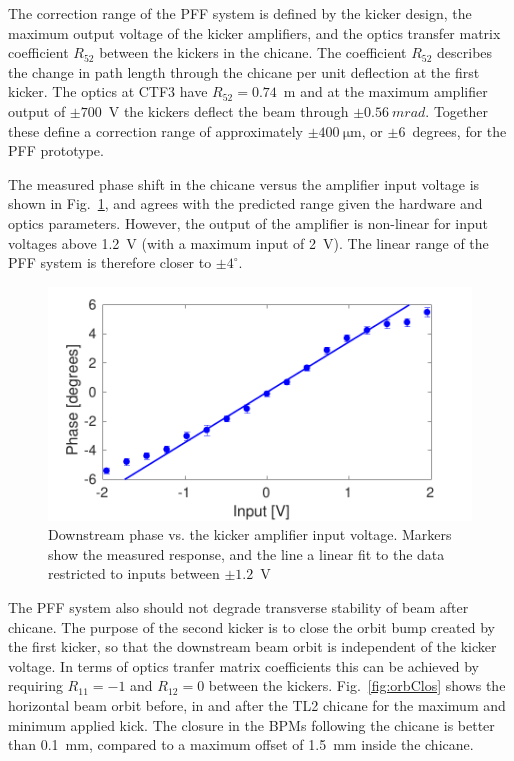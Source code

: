 \documentclass[%
 reprint,
 amsmath,amssymb,
 prl,
]{revtex4-1}
\begin{document}
The correction range of the PFF system is defined by the kicker design, the 
maximum output voltage of the kicker amplifiers, and the optics transfer matrix 
coefficient \(R_{52}\) between the kickers in the chicane. The coefficient 
\(R_{52}\) describes the change in path length through the chicane per unit 
deflection at the first kicker. The optics at CTF3 have \(R_{52} = 0.74\)~m and 
at the maximum amplifier output 
of \(\pm700\)~V the kickers deflect the beam through \(\pm0.56~mrad\). Together 
these 
define a correction range of approximately \(\pm400~\mathrm{\mu m}\), or 
\(\pm6\)~degrees, for the PFF 
prototype.

The measured phase shift in the chicane versus the amplifier input voltage is 
shown in Fig.~\ref{fig:corrRange}, and agrees with the predicted range given 
the hardware and optics parameters. However, the output of the amplifier is 
non-linear for input voltages above 1.2~V (with a maximum input of 2~V). The 
linear range of the PFF system is therefore closer to \(\pm4^\circ\).


\begin{figure}
	\includegraphics[width=\columnwidth]{figs/corrRange}
	\caption{\label{fig:corrRange}Downstream phase vs. the kicker amplifier 
	input voltage. Markers show the measured response, and the line a linear 
	fit to the data restricted to inputs between \(\pm1.2\)~V}
\end{figure}

The PFF system also should not degrade transverse stability of beam after 
chicane. The purpose of the second kicker is to close the orbit bump created by 
the first kicker, so that the downstream beam orbit is independent of the 
kicker voltage. In terms of optics tranfer matrix coefficients this can be 
achieved by requiring \(R_{11}=-1\) and \(R_{12}=0\) between the 
kickers. Fig.~\ref{fig:orbClos} shows the horizontal beam orbit before, in and 
after the TL2 chicane for the maximum and minimum applied kick. The closure in 
the BPMs following the chicane is better than 0.1~mm, compared to a maximum 
offset of 1.5~mm inside the chicane.
\end{document}
